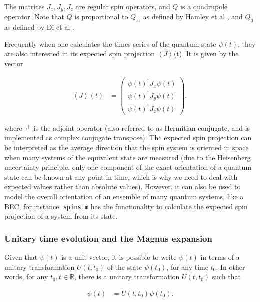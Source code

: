\documentclass{jors}
\begin{document}
			The matrices \(J_x, J_y, J_z\) are regular spin operators, and \(Q\) is a quadrupole operator. Note that \(Q\) is proportional to \(Q_{zz}\) as defined by Hamley et al \cite{hamley_spin-nematic_2012}, and \(Q_0\) as defined by Di et al \cite{di_dipolequadrupole_2010}.

			Frequently when one calculates the times series of the quantum state \(\psi(t)\), they are also interested in its expected spin projection \(\left\langle J\right\rangle\)(t). It is given by the vector

			\begin{align}
				\left\langle J\right\rangle(t) &= \begin{pmatrix}
					\psi(t)^\dagger J_x \psi(t)\\
					\psi(t)^\dagger J_y \psi(t)\\
					\psi(t)^\dagger J_z \psi(t)
				\end{pmatrix},
			\end{align}

			where \(\cdot^\dagger\) is the adjoint operator (also referred to as Hermitian conjugate, and is implemented as complex conjugate transpose). The expected spin projection can be interpreted as the average direction that the spin system is oriented in space when many systems of the equivalent state are measured (due to the Heisenberg uncertainty principle, only one component of the exact orientation of a quantum state can be known at any point in time, which is why we need to deal with expected values rather than absolute values). However, it can also be used to model the overall orientation of an ensemble of many quantum systems, like a BEC, for instance. \texttt{spinsim} has the functionality to calculate the expected spin projection of a system from its state.
		
		\subsubsection{Unitary time evolution and the Magnus expansion}
			Given that \(\psi(t)\) is a unit vector, it is possible to write \(\psi(t)\) in terms of a unitary transformation \(U(t, t_0)\) of the state \(\psi(t_0)\), for any time \(t_0\). In other words, for any \(t_0,t \in \mathbb{R}\), there is a unitary transformation \(U(t, t_0)\) such that
			
			\begin{align}
				\psi(t) &= U(t, t_0)\psi(t_0).
			\end{align}
\end{document}
